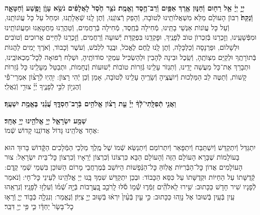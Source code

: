 \documentclass[twoside, openany, parskip=half, 11pt]{book}
\begin{document}
\pesicha

\begin{sometimes}

\\
 \textbf{יְיָ֣ יְיָ֔ אֵ֥ל רַח֖וּם וְֿחַנּ֑וּן אֶ֥רֶךְ אַפַּ֖יִם וְֿרַב־חֶ֥סֶד וֶאֱמֶֽת׃ נֹצֵ֥ר חֶ֙סֶד֙ לָאֲלָפִ֔ים נֹשֵׂ֥א עָוֺ֛ן וָפֶ֖שַׁע וְֿחַטָּאָ֑ה וְֿנַקֵּה֙׃}
רִבּוֺן הָעוׂלָם מַלֵּא מִשְׁאֲלוׂתֵֽינוּ לְֿטוׂבָה, וְֿהָפֵק רְֿצוׂנֵֽנוּ, וְֿתֶן לָֽנוּ שְֿׁאֵלָתֵֽנוּ, וּמְחַל עַל כָּל עֲוׂנוׂתֵֽנוּ, וְֿעַל כָּל עֲוׂנוׂת אַנְשֵׁי בָתֵּֽינוּ, מְֿחִילָה בְּֿחֶֽסֶד, מְֿחִילָה בְּֿרַחֲמִים, וְֿטַהֲרֵֽנוּ מֵחֲטָאֵֽנוּ וּמֵעֲוׂנוׂתֵֽינוּ וּמִפְּֿשָׁעֵֽינוּ, וְזׇכְרֵנוּ בְּֿזִכְרוׂן טוׂב לְֿפָנֶֽיךָ, וּפׇקְדֵֽנוּ בִּפְקֻדַּת יְֿשׁוּעָה וְֿרַחֲמִים, וְֿזׇכְרֵֽנוּ לְֿחַיִּים אֲרוּכִים וְֿטוׂבִים וּלְשָׁלוׂם, וּפַרְנָסָה וְֿכַלְכָּלָה, וְֿתֶן לָֽנוּ לֶֽחֶם לֶאֱכׂל, וּבֶֽגֶד לִלְבּׂשׁ, וְֿעׂשֶׁר וְֿכָבוׂד, וְֿאׂרֶךְ יָמִים לַהֲגוׂת בְּֿתוׂרָתֶֽךָ וּלְקַיֵּם מִצְוׂתֶֽהָ, וְֿשֵֽׂכֶל וּבִינָה לְֿהָבִין וּלְהַשְׂכִּיל עִמְקֵי סוׂדוׂתֶֽיהָ, וּשְׁלַח רְֿפוּאָה לְֿכׇל־מַכְאוׂבֵֽינוּ, וּתְבָרֵךְ אֶת־כָּל מַעֲשֵׁה יָדֵֽינוּ, וְֿתִגְזׂר עָלֵֽינוּ גְּֿזֵרוׂת טוׂבוׂת יְֿשׁוּעוׂת וְֿנֶחָמוׂת, וּתְבַטֵּל מֵעָלֵֽינוּ כָּל גְּֿזֵרוׂת קָשׁוׂת, וְֿתַטֶּה לֵב הַמַּלְכוּת וְֿיוׂעֲצֶֽיהָ וְֿשָׂרֶֽיהָ עָלֵֽינוּ לְֿטוׂבָה, אָמֵן וְֿכֵן יְֿהִי רָצוׂן:
%
 יִ֥הְיֽוּ לְֿרָצ֨וֹן אִמְרֵי־פִ֡י וְֿהֶגְי֣וֹן לִבִּ֣י לְֿפָנֶ֑יךָ יְ֜יָ֗ צוּרִ֥י וְֿגֹֽאֲלִֽי׃


\textbf{וַאֲנִ֤י תְֿפִלָּֽתִי־לְֿֿךָ֨ יְיָ֡ עֵ֤ת רָצ֗וֹן אֱלֹהִ֥ים בְּֿרָב־חַסְדֶּ֑ךָ עֲ֝נֵ֗נִי בֶּאֱמֶ֥ת יִשְׁעֶֽךָ׃}

\end{sometimes}

\brikhshmei

\textbf{שְׁמַ֖ע יִשְׂרָאֵ֑ל יְיָ֥ אֱלֹהֵ֖ינוּ יְיָ֥ אֶחָֽד׃}\\

אֶחָד אֱלֹהֵֽינוּ גָּדוֹל אֲדוֹנֵֽנוּ קָדוֹשׁ שְֿׁמוֹ:

\gadlu

\label{al hakol}
יִתְגַּדַּל וְֿיִתְקַדַּשׁ וְֿיִשְׁתַּבַּח וְֿיִתְפָּאַר וְֿיִתְרוֹמַם וְֿיִתְנַשֵּׂא שְֿׁמוֹ שֶׁל מֶֽלֶךְ מַלְכֵי הַמְּֿלָכִים הַקְָּֿדוֹשׁ בָּרוּךְ הוּא בָּעוֹלָמוֹת שֶׁבָּרָא הָעוֹלָם הַזֶּה וְֿהָעוֹלָם הַבָּא כִּרְצוֹנוֹ וְֿכִרְצוֹן יְֿרֵאָיו וְֿכִרְצוֹן כׇּל־בֵּית יִשְׂרָאֵל: צוּר הָעוֹלָמִים אֲדוֹן כׇּל־הַבְּֿרִיּוֹת אֱלֽוֹהַּ כׇּל־הַנְּֿפָשׁוֹת הַיּוֹשֵׁב בְּֿמֶרְחֲבֵי מָרוֹם הַשּׁוֹכֵן בִּשְׁמֵי שְֿׁמֵי קֶֽדֶם: קְֿדֻשָּׁתוֹ עַל הַחַיּוֹת וּקְדֻשָּׁתוֹ עַל כִּסֵּא הַכָּבוֹד: וּבְכֵן יִתְקַדַּשׁ שִׁמְךָ בָּֽנוּ יְיָ אֱלֹהֵֽינוּ לְֿעֵינֵי כׇּל־חָי: וְֿנֹאמַר לְֿפָנָיו שִׁיר חָדָשׁ כַּכָּתוּב:
 שִׁ֥ירוּ לֵֽאלֹהִֽ֘ים זַמְּֿר֢וּ שְֿׁ֫מ֥וֹ סֹ֡לּוּ לָֽרֹכֵ֣ב בָּֽ֭עֲרָבוֹת בְּֿיָ֥הּ שְֿׁ֝מ֗וֹ וְֿעִלְז֥וּ לְֿפָנָֽיו׃ וְֿנִרְאֵֽהוּ עַֽיִן בְּֿעַֽיִן בְּֿשׁוּבוֹ אֶל נָוֵֽהוּ כַּכָּתוּב:
%
 כִּ֣י עַ֤יִן בְּֿעַ֨יִן֙ יִרְא֔וּ בְּֿשׁ֥וּב יְיָ֖ צִיּֽוֹן׃ וְֿנֶאֱמַר:
וְנִגְלָ֖ה כְּֿב֣וֹד יְיָ֑ וְֿרָא֤וּ כׇל־בָּשָׂר֙ יַחְדָּ֔ו כִּ֛י פִּ֥י יְיָ֖ דִּבֵּֽר׃
\end{document}
